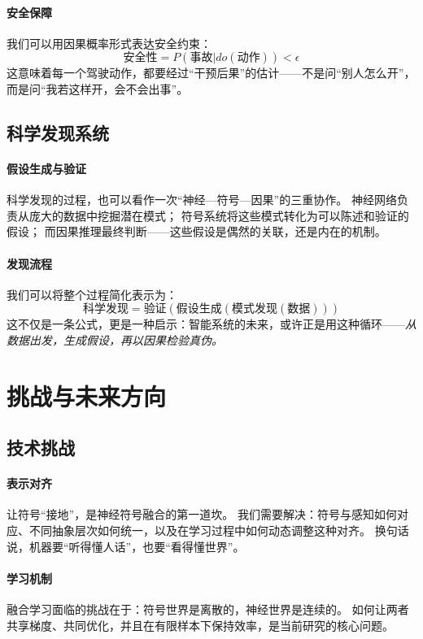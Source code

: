 \paragraph{安全保障}
我们可以用因果概率形式表达安全约束：  
$$\text{安全性} = P(\text{事故}|do(\text{动作})) < \epsilon$$
这意味着每一个驾驶动作，都要经过“干预后果”的估计——不是问“别人怎么开”，而是问“我若这样开，会不会出事”。

\subsection{科学发现系统}

\paragraph{假设生成与验证}
科学发现的过程，也可以看作一次“神经—符号—因果”的三重协作。  
神经网络负责从庞大的数据中挖掘潜在模式；  
符号系统将这些模式转化为可以陈述和验证的假设；  
而因果推理最终判断——这些假设是偶然的关联，还是内在的机制。

\paragraph{发现流程}
我们可以将整个过程简化表示为：  
$$\text{科学发现} = \text{验证}(\text{假设生成}(\text{模式发现}(\text{数据})))$$
这不仅是一条公式，更是一种启示：智能系统的未来，或许正是用这种循环——\emph{从数据出发，生成假设，再以因果检验真伪。}

\section{挑战与未来方向}

\subsection{技术挑战}

\paragraph{表示对齐}
让符号“接地”，是神经符号融合的第一道坎。  
我们需要解决：符号与感知如何对应、不同抽象层次如何统一，以及在学习过程中如何动态调整这种对齐。  
换句话说，机器要“听得懂人话”，也要“看得懂世界”。

\paragraph{学习机制}
融合学习面临的挑战在于：符号世界是离散的，神经世界是连续的。  
如何让两者共享梯度、共同优化，并且在有限样本下保持效率，是当前研究的核心问题。

